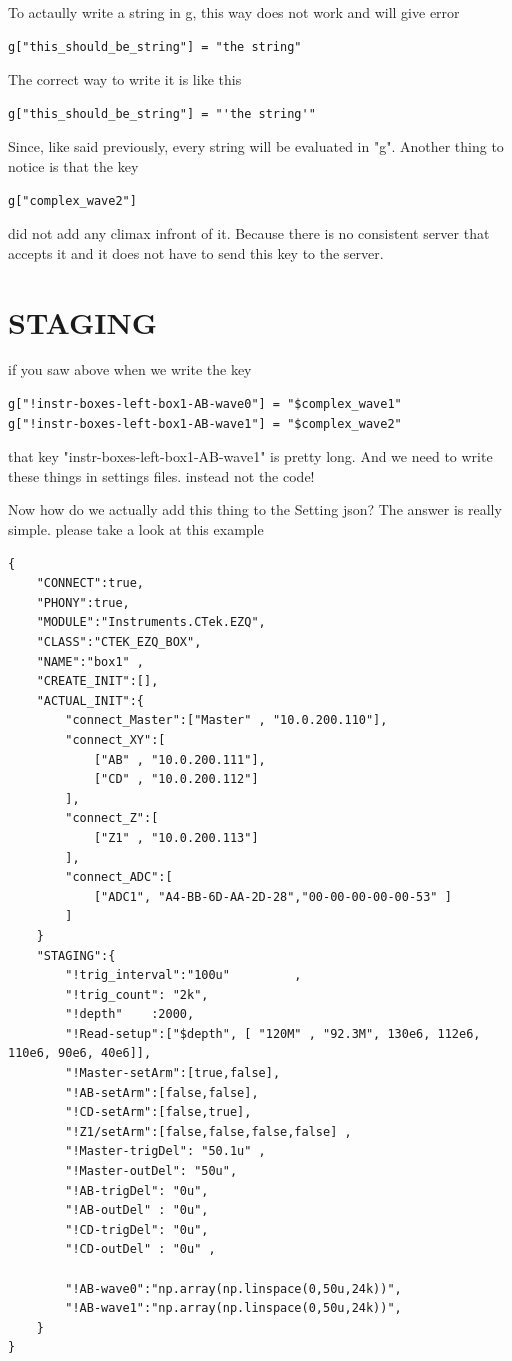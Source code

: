 \documentclass{article}
\begin{document}
To actaully write a string in g, this way does not work and will give error

\begin{lstlisting}
g["this_should_be_string"] = "the string"
\end{lstlisting}
The correct way to write it is like this 
\begin{lstlisting}
g["this_should_be_string"] = "'the string'"
\end{lstlisting}
Since, like said previously, every string will be evaluated in "g".
Another thing to notice is that the key 
\begin{lstlisting}
g["complex_wave2"] 
\end{lstlisting}
did not add any climax infront of it. Because there is
no consistent server that accepts it and it does not have to send this key to the server.


\section{STAGING}
if you saw above when we write the key 
\begin{lstlisting}
g["!instr-boxes-left-box1-AB-wave0"] = "$complex_wave1"
g["!instr-boxes-left-box1-AB-wave1"] = "$complex_wave2"
\end{lstlisting}
that key "instr-boxes-left-box1-AB-wave1" is pretty long.
And we need to write these things in settings files. instead not the code! 

Now how do we actually add this thing to the Setting json? 
The answer is really simple. please take a look at this example

\begin{lstlisting}
{
	"CONNECT":true,
	"PHONY":true, 	
	"MODULE":"Instruments.CTek.EZQ",
	"CLASS":"CTEK_EZQ_BOX", 
	"NAME":"box1" ,
	"CREATE_INIT":[],
	"ACTUAL_INIT":{
		"connect_Master":["Master" , "10.0.200.110"], 
		"connect_XY":[
			["AB" , "10.0.200.111"], 
			["CD" , "10.0.200.112"]
		],
		"connect_Z":[
			["Z1" , "10.0.200.113"]
		],
		"connect_ADC":[
			["ADC1", "A4-BB-6D-AA-2D-28","00-00-00-00-00-53" ]
		]
	}  
	"STAGING":{
		"!trig_interval":"100u"			,
		"!trig_count": "2k",
		"!depth"	:2000,
		"!Read-setup":["$depth", [ "120M" , "92.3M", 130e6, 112e6, 110e6, 90e6, 40e6]],
		"!Master-setArm":[true,false],
		"!AB-setArm":[false,false],
		"!CD-setArm":[false,true],
		"!Z1/setArm":[false,false,false,false] ,
		"!Master-trigDel": "50.1u" ,
		"!Master-outDel": "50u", 
		"!AB-trigDel": "0u",
		"!AB-outDel" : "0u", 
		"!CD-trigDel": "0u",
		"!CD-outDel" : "0u" ,
		
		"!AB-wave0":"np.array(np.linspace(0,50u,24k))",
		"!AB-wave1":"np.array(np.linspace(0,50u,24k))",
	}
}
\end{lstlisting}
\end{document}
